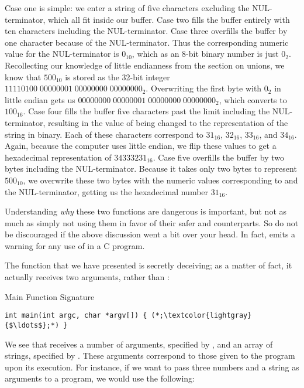 Case one is simple: we enter a string of five characters excluding the NUL-terminator, which all fit inside our buffer. Case two fills the buffer entirely with ten characters including the NUL-terminator. Case three overfills the buffer by one character because of the NUL-terminator. Thus the corresponding numeric value for the NUL-terminator is $0_{10}$, which as an 8-bit binary number is just $0_2$. Recollecting our knowledge of little endianness from the section on unions, we know that $500_{10}$ is stored as the 32-bit integer $11110100\;00000001\;00000000\;00000000_{2}$. Overwriting the first byte with $0_{2}$ in little endian gets us $00000000\;00000001\;00000000\;00000000_{2}$, which converts to $100_{16}$. Case four fills the buffer five characters past the limit including the NUL-terminator, resulting in the value of  being changed to the representation of the string  in binary. Each of these characters correspond to $31_{16}$, $32_{16}$, $33_{16}$, and $34_{16}$. Again, because the computer uses little endian, we flip these values to get a hexadecimal representation of $34333231_{16}$. Case five overfills the buffer by two bytes including the NUL-terminator. Because it takes only two bytes to represent $500_{10}$, we overwrite these two bytes with the numeric values corresponding to  and the NUL-terminator, getting us the hexadecimal number $31_{16}$.

Understanding \textit{why} these two functions are dangerous is important, but not as much as simply not using them in favor of their safer  and  counterparts. So do not be discouraged if the above discussion went a bit over your head. In fact,  emits a warning for any use of  in a C program.


The  function that we have presented is secretly deceiving; as a matter of fact, it actually receives two arguments, rather than :

\begin{cl}[main.c]{Main Function Signature}
\begin{lstlisting}[language=MyC]
int main(int argc, char *argv[]) { (*;\textcolor{lightgray}{$\ldots$};*) }
\end{lstlisting}
\end{cl}

We see that  receives a number of arguments, specified by , and an array of strings, specified by . These arguments correspond to those given to the program upon its execution. For instance, if we want to pass three numbers and a string as arguments to a program, we would use the following:

